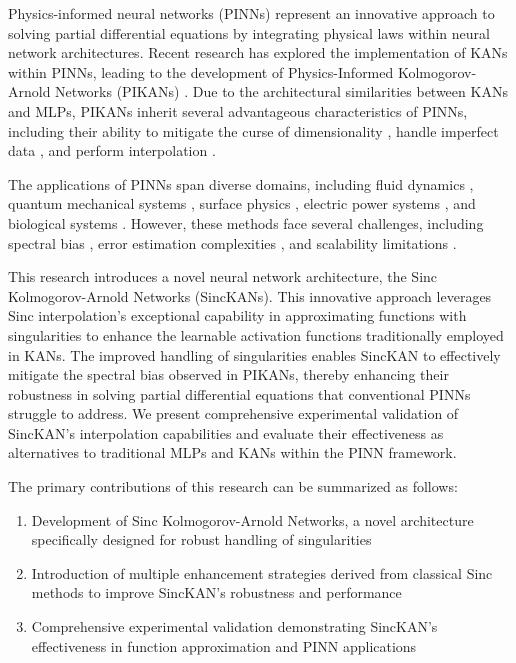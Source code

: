 Physics-informed neural networks (PINNs) \citep{lagaris1998artificial,raissi2019physics} represent an innovative approach to solving partial differential equations by integrating physical laws within neural network architectures. Recent research has explored the implementation of KANs within PINNs, leading to the development of Physics-Informed Kolmogorov-Arnold Networks (PIKANs) \citep{rigas2024adaptive,wang2024kolmogorov}. Due to the architectural similarities between KANs and MLPs, PIKANs inherit several advantageous characteristics of PINNs, including their ability to mitigate the curse of dimensionality \citep{wojtowytsch2020can,han2018solving}, handle imperfect data \citep{karniadakis2021physics}, and perform interpolation \citep{sliwinski2023mean}.

The applications of PINNs span diverse domains, including fluid dynamics \citep{raissi2020hidden,jin2021nsfnets,kashefi2022physics}, quantum mechanical systems \citep{jin2022physics}, surface physics \citep{fang2019physics}, electric power systems \citep{nellikkath2022physics}, and biological systems \citep{yazdani2020systems}. However, these methods face several challenges, including spectral bias \citep{xu2019frequency,wang2022and}, error estimation complexities \citep{fanaskov2024astral}, and scalability limitations \citep{yao2023multiadam}.

This research introduces a novel neural network architecture, the Sinc Kolmogorov-Arnold Networks (SincKANs). This innovative approach leverages Sinc interpolation's exceptional capability in approximating functions with singularities to enhance the learnable activation functions traditionally employed in KANs. The improved handling of singularities enables SincKAN to effectively mitigate the spectral bias observed in PIKANs, thereby enhancing their robustness in solving partial differential equations that conventional PINNs struggle to address. We present comprehensive experimental validation of SincKAN's interpolation capabilities and evaluate their effectiveness as alternatives to traditional MLPs and KANs within the PINN framework.

The primary contributions of this research can be summarized as follows:
\begin{enumerate}
    \item Development of Sinc Kolmogorov-Arnold Networks, a novel architecture specifically designed for robust handling of singularities
    \item Introduction of multiple enhancement strategies derived from classical Sinc methods to improve SincKAN's robustness and performance
    \item Comprehensive experimental validation demonstrating SincKAN's effectiveness in function approximation and PINN applications
\end{enumerate}

